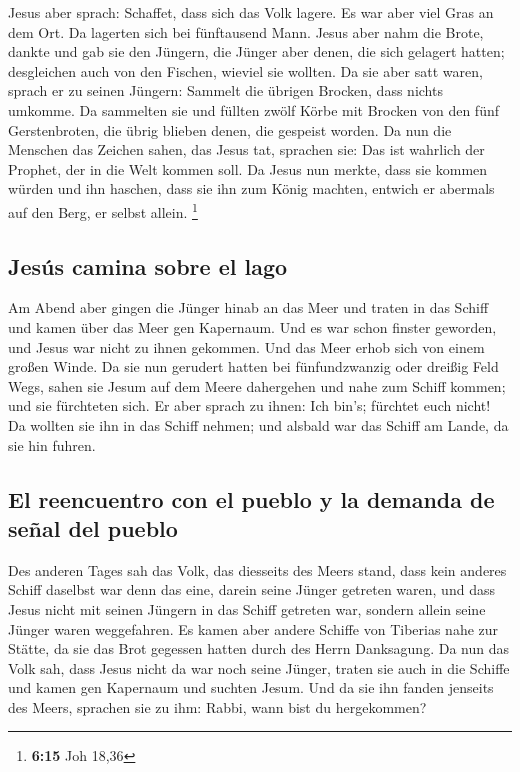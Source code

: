  Jesus aber sprach: Schaffet, dass sich das Volk lagere.
Es war aber viel Gras an dem Ort. Da lagerten sich bei fünftausend Mann.
 Jesus aber nahm die Brote, dankte und gab sie den
Jüngern, die Jünger aber denen, die sich gelagert hatten; desgleichen
auch von den Fischen, wieviel sie wollten.  Da sie aber
satt waren, sprach er zu seinen Jüngern: Sammelt die übrigen Brocken,
dass nichts umkomme.  Da sammelten sie und füllten zwölf
Körbe mit Brocken von den fünf Gerstenbroten, die übrig blieben denen,
die gespeist worden.  Da nun die Menschen das Zeichen
sahen, das Jesus tat, sprachen sie: Das ist wahrlich der Prophet, der in
die Welt kommen soll.  Da Jesus nun merkte, dass sie
kommen würden und ihn haschen, dass sie ihn zum König machten, entwich
er abermals auf den Berg, er selbst allein. \footnote{\textbf{6:15} Joh
  18,36}

\hypertarget{jesuxfas-camina-sobre-el-lago}{%
\subsection{Jesús camina sobre el
lago}\label{jesuxfas-camina-sobre-el-lago}}

 Am Abend aber gingen die Jünger hinab an das Meer
 und traten in das Schiff und kamen über das Meer gen
Kapernaum. Und es war schon finster geworden, und Jesus war nicht zu
ihnen gekommen.  Und das Meer erhob sich von einem großen
Winde.  Da sie nun gerudert hatten bei fünfundzwanzig
oder dreißig Feld Wegs, sahen sie Jesum auf dem Meere dahergehen und
nahe zum Schiff kommen; und sie fürchteten sich.  Er aber
sprach zu ihnen: Ich bin's; fürchtet euch nicht!  Da
wollten sie ihn in das Schiff nehmen; und alsbald war das Schiff am
Lande, da sie hin fuhren.

\hypertarget{el-reencuentro-con-el-pueblo-y-la-demanda-de-seuxf1al-del-pueblo}{%
\subsection{El reencuentro con el pueblo y la demanda de señal del
pueblo}\label{el-reencuentro-con-el-pueblo-y-la-demanda-de-seuxf1al-del-pueblo}}

 Des anderen Tages sah das Volk, das diesseits des Meers
stand, dass kein anderes Schiff daselbst war denn das eine, darein seine
Jünger getreten waren, und dass Jesus nicht mit seinen Jüngern in das
Schiff getreten war, sondern allein seine Jünger waren weggefahren.
 Es kamen aber andere Schiffe von Tiberias nahe zur
Stätte, da sie das Brot gegessen hatten durch des Herrn Danksagung.
 Da nun das Volk sah, dass Jesus nicht da war noch seine
Jünger, traten sie auch in die Schiffe und kamen gen Kapernaum und
suchten Jesum.  Und da sie ihn fanden jenseits des Meers,
sprachen sie zu ihm: Rabbi, wann bist du hergekommen?

